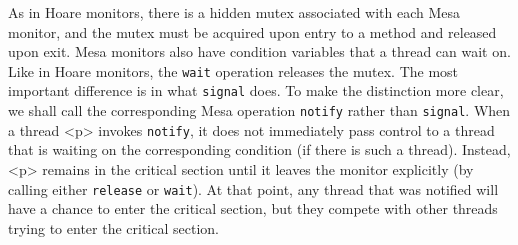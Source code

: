 \documentclass{report}
\begin{document}
{As in Hoare monitors, there is a hidden mutex associated with each Mesa monitor,
and the mutex must be acquired upon entry to a method and released
upon exit.
Mesa monitors also have condition variables that a thread can wait on.
Like in Hoare monitors, the \texttt{wait} operation releases the mutex.
The most important difference is in what \texttt{signal} does.
To make the distinction more clear, we shall call the corresponding Mesa
operation \texttt{notify} rather than \texttt{signal}.
%
When a thread <{p}> invokes \texttt{notify}, it does not immediately pass 
control to a thread that is waiting on the corresponding condition (if there
is such a thread).  Instead, <{p}> remains in the critical section
until it leaves the monitor explicitly
(by calling either \texttt{release} or \texttt{wait}).
At that point, any thread that
was notified will have a chance to enter the critical section, but they compete
with other threads trying to enter the critical section.

}
\end{document}
